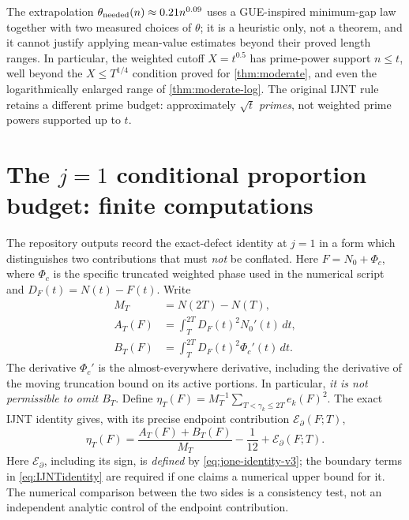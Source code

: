 \documentclass[11pt,a4paper]{article}
\numberwithin{equation}{section}
\theoremstyle{definition}
\theoremstyle{remark}
\begin{document}
The extrapolation $\theta_{\rm needed}(n)\approx0.21 n^{0.09}$
uses a GUE-inspired minimum-gap law together with two measured
choices of $\theta$; it is a heuristic only, not a theorem, and it
cannot justify applying mean-value estimates beyond their proved
length ranges. In particular, the weighted cutoff $X=t^{0.5}$ has
prime-power support $n\le t$, well beyond the $X\le T^{1/4}$
condition proved for \cref{thm:moderate}, and even the logarithmically
enlarged range of \cref{thm:moderate-log}. The original IJNT rule
retains a different prime budget: approximately $\sqrt t$ \emph{primes},
not weighted prime powers supported up to $t$.


\section{The \texorpdfstring{$j=1$}{j=1} conditional proportion budget: finite computations}\label{sec:jone-v3}
The repository outputs \cite{CasanaV9} record the exact-defect
identity at $j=1$ in a form which distinguishes two contributions that
must \emph{not} be conflated. Here $F=N_0+\Phi_c$, where $\Phi_c$ is the
specific truncated weighted phase used in the numerical script and
$D_F(t)=N(t)-F(t)$. Write
\begin{equation}\label{eq:jone-AB-v3}
\begin{split}
M_T&=N(2T)-N(T),\\
A_T(F)&=\int_T^{2T}D_F(t)^2 N_0'(t)\,dt,\\
B_T(F)&=\int_T^{2T}D_F(t)^2 \Phi_c'(t)\,dt.
\end{split}
\end{equation}
The derivative $\Phi_c'$ is the almost-everywhere derivative, including
the derivative of the moving truncation bound on its active portions.
In particular, \emph{it is not permissible to omit $B_T$}.
Define
$\eta_T(F)=M_T^{-1}\sum_{T<\gamma_k\le2T}e_k(F)^2$.
The exact IJNT identity gives, with its precise endpoint contribution
$\mathcal E_{\partial}(F;T)$,
\begin{equation}\label{eq:jone-identity-v3}
\eta_T(F)=\frac{A_T(F)+B_T(F)}{M_T}-\frac1{12}
+\mathcal E_{\partial}(F;T).
\end{equation}
Here $\mathcal E_{\partial}$, including its sign, is \emph{defined} by
\eqref{eq:jone-identity-v3}; the boundary terms in
\eqref{eq:IJNTidentity} are required if one claims a numerical upper bound for it.
The numerical comparison between the two sides is a consistency test,
not an independent analytic control of the endpoint contribution.
\end{document}
